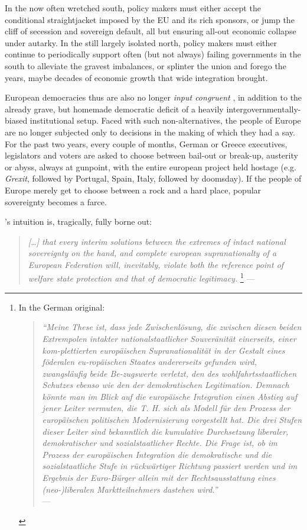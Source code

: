 \documentclass[11pt,a4paper,oneside,openright]{article}
\begin{document}
In the now often wretched south, policy makers must either accept the conditional straightjacket imposed by the \gls{EU} and its rich sponsors, or jump the cliff of secession and sovereign default, all but ensuring all-out economic collapse under autarky. 
In the still largely isolated north, policy makers must either continue to periodically support often (but not always) failing governments in the south to alleviate the gravest imbalances, or splinter the union and forego the years, maybe decades of economic growth that wide integration brought.

European democracies thus are also no longer \emph{input congruent} \citep{Zurn-2000-aa}, in addition to the already grave, but homemade democratic deficit of a heavily intergovernmentally-biased institutional setup. 
Faced with such non-alternatives, the people of Europe are no longer subjected only to decisions in the making of which they had a say. 
For the past two years, every couple of months, German or Greece executives, legislators and voters are asked to choose between bail-out or break-up, austerity or abyss, always at gunpoint, with the entire european project held hostage (e.g. \emph{Grexit}, followed by Portugal, Spain, Italy, followed by doomsday). 
If the people of Europe merely get to choose between a rock and a hard place, popular sovereignty becomes a farce.

\citeauthor{Offe1998}'s \citeyear{Offe1998} intuition is, tragically, fully borne out:	
\begin{quote}
	\emph{[\ldots] that every interim solutions between the extremes of intact national sovereignty on the hand, and complete european supranationalty of a European Federation will, inevitably, violate both the reference point of welfare state protection and that of democratic legitimacy.}
	\footnote{\label{fn:Offe_regress}
		In the German original:\\
		\begin{quote}
			\emph{``Meine These ist, dass jede Zwischenl\"{o}sung, die zwischen diesen beiden Extrempolen intakter nationalstaatlicher Souver\"{a}nit\"{a}t einerseits, einer kom-plettierten europ\"{a}ischen Supranationalität in der Gestalt eines föderalen eu-ropäischen Staates andererseits gefunden wird, zwangsl\"{a}ufig beide Be-zugswerte verletzt, den des wohlfahrtsstaatlichen Schutzes ebenso wie den der demokratischen Legitimation. 
			Demnach k\"{o}nnte man im Blick auf die europäische Integration einen Abstieg auf jener Leiter vermuten, die T. H. \cite{Marshall-1950-aa} sich als Modell für den Prozess der europ\"{a}ischen politischen Modernisierung vorgestellt hat. 
			Die drei Stufen dieser Leiter sind bekanntlich die kumulative Durchsetzung liberaler, demokratischer und sozialstaatlicher Rechte. 
			Die Frage ist, ob im Prozess der europäischen Integration die demokratische und die sozialstaatliche Stufe in r\"{u}ckw\"{a}rtiger Richtung passiert werden und im Ergebnis der Euro-B\"{u}rger allein mit der Rechtsausstattung eines (neo-)liberalen Marktteilnehmers dastehen wird.''}\\
			--- \cite[41]{Offe1998}\\
		\end{quote}
	}
	--- \cite[41]{Offe1998}
\end{quote}
\end{document}
